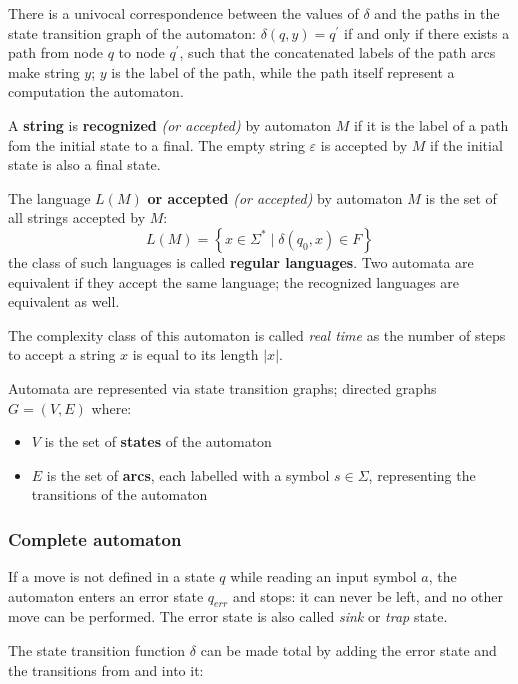 \documentclass[english]{article}
\begin{document}
There is a univocal correspondence between the values of \(\delta\) and the paths in the state transition graph of the automaton: \(\delta(q, y) = q^\prime\) if and only if there exists a path from node \(q\) to node \(q^\prime\), such that the concatenated labels of the path arcs make string \(y\);
\(y\) is the label of the path, while the path itself represent a computation the automaton.

A \textbf{string} is \textbf{recognized} \textit{(or accepted)} by automaton \(M\) if it is the label of a path fom the initial state to a final.
The empty string \(\varepsilon\) is accepted by \(M\) if the initial state is also a final state.

The language \(L(M)\) \textbf{or accepted} \textit{(or accepted)} by automaton \(M\) is the set of all strings accepted by \(M\):
\[ L(M) = \left\{ x \in \Sigma^\ast \mid \delta(q_0, x) \in F \right\} \]
the class of such languages is called \textbf{regular languages}.
Two automata are equivalent if they accept the same language;
the recognized languages are equivalent as well.

The complexity class of this automaton is called \textit{real time} as the number of steps to accept a string \(x\) is equal to its length \(|x|\).

\bigskip
Automata are represented via state transition graphs; directed graphs \(G = (V, E)\) where:

\begin{itemize}
  \item \(V\) is the set of \textbf{states} of the automaton
  \item \(E\) is the set of \textbf{arcs}, each labelled with a symbol \(s \in \Sigma\), representing the transitions of the automaton
\end{itemize}

\subsubsection{Complete automaton}

If a move is not defined in a state \(q\) while reading an input symbol \(a\), the automaton enters an error state \(q_\textit{err}\) and stops: it can never be left, and no other move can be performed.
The error state is also called \textit{sink} or \textit{trap} state.

\bigskip
The state transition function \(\delta\) can be made total by adding the error state and the transitions from and into it:
\end{document}
